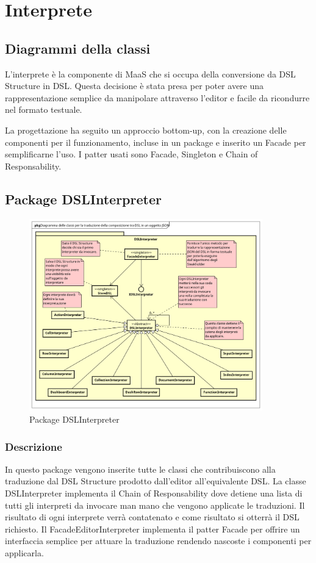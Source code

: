 \section{Interprete}
\subsection{Diagrammi della classi}
L'interprete è la componente di MaaS che si occupa della conversione da DSL Structure in DSL. Questa decisione è stata presa per poter avere una rappresentazione semplice da manipolare attraverso l'editor e facile da ricondurre nel formato testuale.

La progettazione ha seguito un approccio bottom-up, con la creazione delle componenti per il funzionamento, incluse in un package e inserito un Facade per semplificarne l'uso. I patter usati sono Facade, Singleton e Chain of Responsability.
\subsection{Package DSLInterpreter}
\begin{figure}[H]
  \centering
  \includegraphics[width=0.9\textwidth]{res/img/Diagram_Interpreter.png}
  \caption{Package DSLInterpreter}
  \label{fig:diagram_model}
\end{figure}
\subsubsection{Descrizione}
In questo package vengono inserite tutte le classi che contribuiscono alla traduzione dal DSL Structure prodotto dall'editor all'equivalente DSL.
La classe DSLInterpreter implementa il Chain of Responsability dove detiene una lista di tutti gli interpreti da invocare man mano che vengono applicate le traduzioni. Il risultato di ogni interprete verrà contatenato e come risultato si otterrà il DSL richiesto.
Il FacadeEditorInterpreter implementa il patter Facade per offrire un interfaccia semplice per attuare la traduzione rendendo nascoste i componenti per applicarla.
